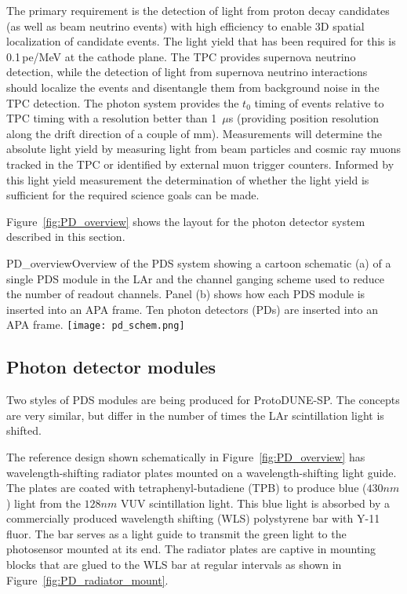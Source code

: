 The primary requirement is the detection of light from proton decay
candidates (as well as beam neutrino events) with high efficiency to
enable 3D spatial localization of candidate events. The light yield that
has been required for this is 0.1\,pe/MeV at the cathode plane.
The TPC  provides supernova neutrino detection, while the detection of light
from supernova neutrino interactions should localize the events and disentangle
them from background noise in the TPC detection.
The photon system provides the $t_0$ timing of
events relative to TPC timing with a resolution better than 1~$\mu$s
(providing position resolution along the drift direction of a couple of mm). 
Measurements %
will determine the absolute
light yield by measuring light from beam particles and cosmic ray muons
tracked in the TPC or identified by external muon trigger counters.
Informed by this light yield measurement the determination of whether the 
light yield is sufficient for the required science goals can be made.

Figure~\ref{fig:PD_overview} shows the layout for the photon detector
system described in this section. %

\begin{cdrfigure}{PD_overview}{Overview of the PDS
    system showing a cartoon schematic (a) of a single PDS module
    in the LAr and the channel ganging scheme used to reduce the
    number of readout channels. Panel (b) shows how each PDS module
   is inserted into an APA frame. Ten photon detectors (PDs) are inserted
    into an APA frame.}
\texttt{[image: pd\_schem.png]}
\end{cdrfigure}

\subsection{Photon detector modules}

Two styles of PDS %
modules are being produced for ProtoDUNE-SP.  
The concepts are very similar, but differ in the number of times the LAr scintillation 
light is shifted.  

The reference design shown schematically in Figure~\ref{fig:PD_overview}
has wavelength-shifting radiator plates mounted on a wavelength-shifting light guide.
The plates are coated 
with tetraphenyl-butadiene (TPB) to produce blue ($430nm$) light from the $128nm$ VUV 
scintillation light.  
This blue light is absorbed by a commercially produced wavelength shifting (WLS)
polystyrene bar with Y-11 fluor.  
The bar serves as a light guide to transmit the green light to the photosensor 
mounted at its end.
The radiator plates are captive in mounting blocks that are glued to the WLS bar
at regular intervals as shown in Figure~\ref{fig:PD_radiator_mount}.

